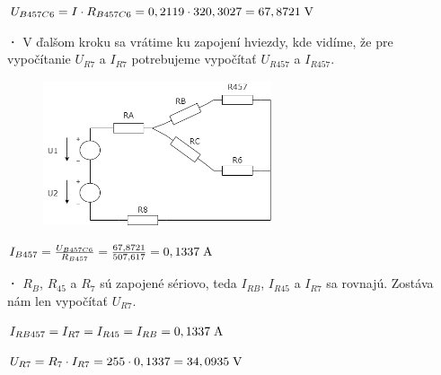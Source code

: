 \begin{center}
$U_{B457C6} = I\cdot{R_{B457C6}} = 0,2119\cdot{320,3027} = 67,8721  \hspace{0,1cm} \SI{}{\volt}$ 
\end{center}

\textbf{·}
V ďalšom kroku sa vrátime ku zapojení hviezdy, kde vidíme, že pre vypočítanie $U_{R7}$ a $I_{R7}$ potrebujeme vypočítať $U_{R457}$ a $I_{R457}$.\\

\begin{figure}[h!]
    \centering
    \includegraphics[width=0.6\textwidth]{IEL-Project/pictures/Pr1_4.png}
\end{figure}

\newpage

\begin{center}
$I_{B457} = \frac{U_{B457C6}}{R_{B457}} = \frac{67,8721}{507,617} = 0,1337 \hspace{0,1cm} \SI{}{\ampere}$
\end{center}

\textbf{·}
$R_B$, $R_{45}$ a $R_7$ sú zapojené sériovo, teda $I_{RB}$, $I_{R45}$ a $I_{R7}$ sa rovnajú. Zostáva nám len vypočítať $U_{R7}$.

\begin{center}
$I_{RB457} = I_{R7} = I_{R45} = I_{RB} = 0,1337 \hspace{0,1cm} \SI{}{\ampere}$ 
\end{center}

\begin{center}
$U_{R7} = R_7\cdot{I_{R7}} = 255\cdot0,1337 = 34,0935 \hspace{0,1cm} \SI{}{\volt}$ 
\end{center}